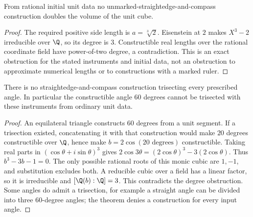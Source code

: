 \begin{theorem}
From rational initial unit data no unmarked-straightedge-and-compass construction doubles the volume of the unit cube.
\end{theorem}
\begin{proof}
The required positive side length is $a=\sqrt[3]{2}$. Eisenstein at $2$ makes $X^3-2$ irreducible over $\Q$, so its degree is $3$. Constructible real lengths over the rational coordinate field have power-of-two degree, a contradiction. This is an exact obstruction for the stated instruments and initial data, not an obstruction to approximate numerical lengths or to constructions with a marked ruler.
\end{proof}

\begin{theorem}
There is no straightedge-and-compass construction trisecting every prescribed angle. In particular the constructible angle $60$ degrees cannot be trisected with these instruments from ordinary unit data.
\end{theorem}
\begin{proof}
An equilateral triangle constructs $60$ degrees from a unit segment. If a trisection existed, concatenating it with that construction would make $20$ degrees constructible over $\Q$, hence make $b=2\cos(20\text{ degrees})$ constructible. Taking real parts in $(\cos\theta+i\sin\theta)^3$ gives $2\cos3\theta=(2\cos\theta)^3-3(2\cos\theta)$. Thus $b^3-3b-1=0$. The only possible rational roots of this monic cubic are $1,-1$, and substitution excludes both. A reducible cubic over a field has a linear factor, so it is irreducible and $[\Q(b):\Q]=3$. This contradicts the degree obstruction. Some angles do admit a trisection, for example a straight angle can be divided into three $60$-degree angles; the theorem denies a construction for every input angle.
\end{proof}

